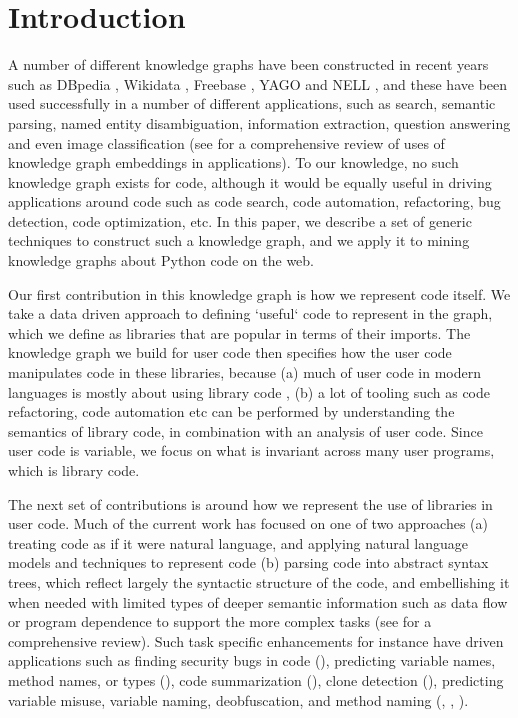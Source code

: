 \section{Introduction}
A number of different knowledge graphs have been constructed in recent years such as DBpedia \cite{dbpedia-swj}, Wikidata \cite{Vrandecic:2014:WFC:2661061.2629489}, Freebase \cite{Bollacker08freebase:a}, YAGO \cite{Suchanek:2007:YCS:1242572.1242667} and NELL \cite{Carlson:2010:TAN:2898607.2898816}, and these have been used successfully in a number of different applications, such as search, semantic parsing, named entity disambiguation, information extraction, question answering and even image classification (see \cite{journals/tkde/WangMWG17} for a comprehensive review of uses of knowledge graph embeddings in applications).  To our knowledge, no such knowledge graph exists for code, although it would be equally useful in driving applications around code such as code search, code automation, refactoring, bug detection, code optimization, etc.  In this paper, we describe a set of generic techniques to construct such a knowledge graph, and we apply it to mining knowledge graphs about Python code on the web.

Our first contribution in this knowledge graph is how we represent code itself.  We take a data driven approach to defining `useful` code to represent in the graph, which we define as libraries that are popular in terms of their imports.  The knowledge graph we build for user code then specifies how the user code manipulates code in these libraries, because (a) much of user code in modern languages is mostly about using library code \cite{?}, (b) a lot of tooling such as code refactoring, code automation etc can be performed by understanding the semantics of library code, in combination with an analysis of user code.  Since user code is variable, we focus on what is invariant across many user programs, which is library code.

The next set of contributions is around how we represent the use of libraries in user code.  Much of the current work has focused on one of two approaches (a) treating code as if it were natural language, and applying natural language models and techniques to represent code (b) parsing code into abstract syntax trees, which reflect largely the syntactic structure of the code, and embellishing it when needed with limited types of deeper semantic information such as data flow or program dependence to support the more complex tasks (see \cite{Allamanis:2018:SML:3236632.3212695} for a comprehensive review).  Such task specific enhancements for instance have driven applications such as finding security bugs in code (\cite{DBLP:journals/corr/abs-1807-06756}), predicting variable names, method names, or types (\cite{DBLP:journals/corr/abs-1803-09544}), code summarization (\cite{DBLP:journals/corr/abs-1708-01837}), clone detection (\cite{White:2016:DLC:2970276.2970326}), predicting variable misuse, variable naming, deobfuscation, and method naming (\cite{DBLP:journals/corr/abs-1711-00740}, \cite{Bichsel:2016:SDA:2976749.2978422}, \cite{DBLP:journals/corr/abs-1808-01400}).   

